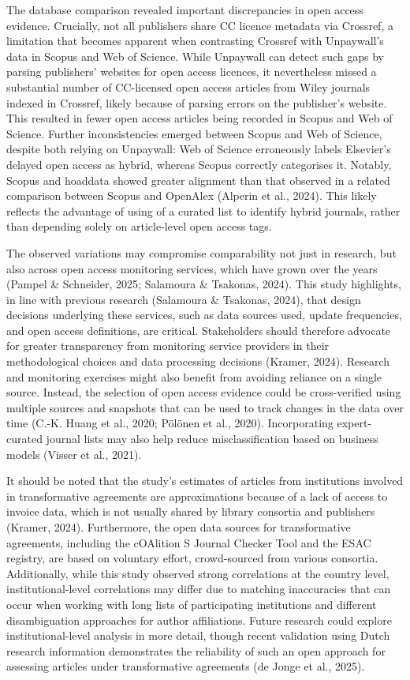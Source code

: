 \documentclass[a4paper,man,floatsintext,longtable,noextraspace,10pt]{apa6}
\begin{document}
The database comparison revealed important discrepancies in open access
evidence. Crucially, not all publishers share CC licence metadata via
Crossref, a limitation that becomes apparent when contrasting Crossref
with Unpaywall's data in Scopus and Web of Science. While Unpaywall can
detect such gaps by parsing publishers' websites for open access
licences, it nevertheless missed a substantial number of CC-licensed
open access articles from Wiley journals indexed in Crossref, likely
because of parsing errors on the publisher's website. This resulted in
fewer open access articles being recorded in Scopus and Web of Science.
Further inconsistencies emerged between Scopus and Web of Science,
despite both relying on Unpaywall: Web of Science erroneously labels
Elsevier's delayed open access as hybrid, whereas Scopus correctly
categorises it. Notably, Scopus and hoaddata showed greater alignment
than that observed in a related comparison between Scopus and OpenAlex
(Alperin et al., 2024). This likely reflects the advantage of using of a
curated list to identify hybrid journals, rather than depending solely
on article-level open access tags.

The observed variations may compromise comparability not just in
research, but also across open access monitoring services, which have
grown over the years (Pampel \& Schneider, 2025; Salamoura \& Tsakonas,
2024). This study highlights, in line with previous research (Salamoura
\& Tsakonas, 2024), that design decisions underlying these services,
such as data sources used, update frequencies, and open access
definitions, are critical. Stakeholders should therefore advocate for
greater transparency from monitoring service providers in their
methodological choices and data processing decisions (Kramer, 2024).
Research and monitoring exercises might also benefit from avoiding
reliance on a single source. Instead, the selection of open access
evidence could be cross-verified using multiple sources and snapshots
that can be used to track changes in the data over time (C.-K. Huang et
al., 2020; Pölönen et al., 2020). Incorporating expert-curated journal
lists may also help reduce misclassification based on business models
(Visser et al., 2021).

It should be noted that the study's estimates of articles from
institutions involved in transformative agreements are approximations
because of a lack of access to invoice data, which is not usually shared
by library consortia and publishers (Kramer, 2024). Furthermore, the
open data sources for transformative agreements, including the cOAlition
S Journal Checker Tool and the ESAC registry, are based on voluntary
effort, crowd-sourced from various consortia. Additionally, while this
study observed strong correlations at the country level,
institutional-level correlations may differ due to matching inaccuracies
that can occur when working with long lists of participating
institutions and different disambiguation approaches for author
affiliations. Future research could explore institutional-level analysis
in more detail, though recent validation using Dutch research
information demonstrates the reliability of such an open approach for
assessing articles under transformative agreements (de Jonge et al.,
2025).
\end{document}

